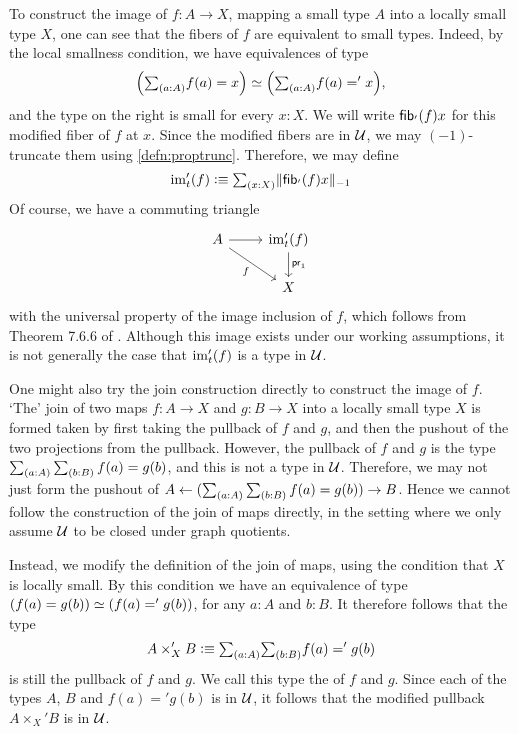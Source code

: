 To construct the image of $f:A\to X$, mapping a small type $A$ into a locally
small type $X$, one can see that
the fibers of $f$ are equivalent to small types. Indeed, by the
local smallness condition, we have equivalences of type
\begin{equation*}
\eqv{\Big(\sm{a:A} f(a)=x\Big)}{\Big(\sm{a:A} f(a) =' x\Big)},
\end{equation*}
and the type on the right is small for every $x:X$. We will write
$\mathsf{fib}_{'}(f){x}$ for this modified fiber of $f$ at $x$. Since the modified fibers
are in $\mathcal{U}$, we may $(-1)$-truncate them using \autoref{defn:proptrunc}. Therefore, we may define
\begin{equation}\label{eq:im_by_trunc}
\im'_t(f)\defeq\sm{x:X}\trunc{-1}{\fib'{f}{x}} 
\end{equation}
Of course, we have a commuting triangle
\begin{equation*}
\begin{tikzcd}
A \arrow[r] \arrow[dr,swap,"f"] & \im'_t(f) \arrow[d,"\proj 1"] \\
& X
\end{tikzcd}
\end{equation*}
with the universal property of the image inclusion of $f$, which follows from
Theorem 7.6.6 of \cite{hottbook}. 
Although this image exists under our working assumptions, 
it is not generally the case that $\operatorname{im}'_t(f)$ is a type in $\mathcal{U}$.

One might also try the join construction directly to construct the image of
$f$. `The' join of two maps $f:A\to X$ and $g:B\to X$ into a locally small type
$X$ is formed taken by first taking the pullback of $f$ and $g$, and then the 
pushout of the two projections from the pullback.
However, the pullback of $f$ and $g$ is the type $\sm{a:A}{b:B}f(a)=g(b)$, and
this is not a type in $\mathcal{U}$. Therefore, we may not just form the pushout
of $A \leftarrow (\sm{a:A}{b:B}f(a)=g(b)) \rightarrow B$. 
Hence we cannot follow the construction of the join of maps directly, in the
setting where we only assume $\mathcal{U}$ to be closed under graph quotients.

Instead, we modify the definition of the join of maps, using the
condition that $X$ is locally small. By this condition we have
an equivalence of type $\eqv{(f(a)=g(b))}{(f(a)='g(b))}$, for any $a:A$ and 
$b:B$. It therefore follows that the type
\begin{equation}\label{eq:modified_pullback}
A\times'_X B \defeq \sm{a:A}{b:B}f(a)='g(b)
\end{equation} is
still the pullback of $f$ and $g$. We call this type the  of $f$ and $g$.
Since each of the types $A$, $B$ and $f(a)='g(b)$ is in $\mathcal{U}$, it follows that
the modified pullback $A\times_X'B$ is in $\mathcal{U}$.

